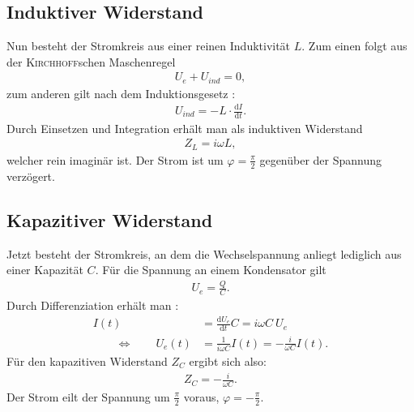 \documentclass[12pt,a4paper,titlepage,headinclude]{scrartcl}
\renewcommand{\d}{\ensuremath{\mathrm{d}}} %
\newcommand{\aeqiv}{\ensuremath{\qquad \Longleftrightarrow \qquad}} %
\newcommand{\person}[1]{\textsc{#1}}
\begin{document}
\subsection{Induktiver Widerstand}
Nun besteht der Stromkreis aus einer reinen Induktivität $L$. Zum einen folgt aus der \person{Kirchhoff}schen Maschenregel \cite[55]{demtroeder2}
\begin{align}
	U_e+U_{ind}=0,
	\label{eq:indmasche}
\end{align}
zum anderen gilt nach dem Induktionsgesetz \cite[131]{demtroeder2}:
\begin{align}
	U_{ind}=-L\cdot\frac{\d I}{\d t}.
	\label{eq:uind}
\end{align}
Durch Einsetzen und Integration erhält man als induktiven Widerstand \cite[256]{nol3}
\begin{align}
	Z_{L}=i\omega L,
	\label{eq:zL}
\end{align}
welcher rein imaginär ist. Der Strom ist um $\varphi=\frac{\pi}{2}$ gegenüber der Spannung verzögert.
\subsection{Kapazitiver Widerstand}
Jetzt besteht der Stromkreis, an dem die Wechselspannung anliegt lediglich aus einer Kapazität $C$. Für die Spannung an einem Kondensator gilt \cite[152]{demtroeder2}
\begin{align}
	U_e=\frac{Q}{C}.
	\label{eq:kond}
\end{align}
Durch Differenziation erhält man \cite[257]{nol3}:
\begin{align}
	I(t)&=\frac{\d U_e}{\d t}C=i\omega C~ U_e\\
	\aeqiv U_e(t)&=\frac{1}{i\omega C}I(t)=-\frac{i}{\omega C}I(t).
	\label{eq:herleitungzC}
\end{align}
Für den kapazitiven Widerstand $Z_C$ ergibt sich also:
\begin{align}
	Z_C=-\frac{i}{\omega C}.
	\label{eq:zC}
\end{align}
Der Strom eilt der Spannung um $\frac{\pi}{2}$ voraus, $\varphi=-\frac{\pi}{2}$.
\end{document}
